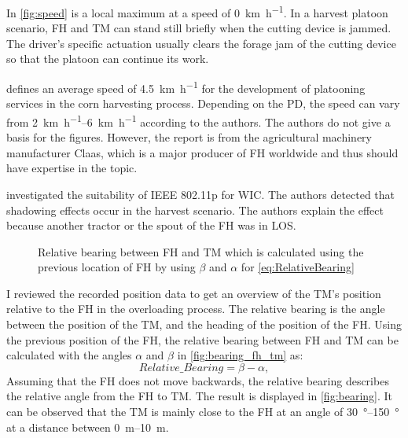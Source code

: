 In \autoref{fig:speed} is a local maximum at a speed of \SI{0}{\kilo\metre\per\hour}. In a harvest platoon scenario, \ac{FH} and \ac{TM} can stand still briefly when the cutting device is jammed.
The driver's specific actuation usually clears the forage jam of the cutting device so that the platoon can continue its work.

\textcite{smolnik_5g_2020} defines an average speed of \SI{4.5}{\kilo\metre\per\hour} for the development of platooning services in the corn harvesting process. Depending on the \ac{PD}, the speed can vary from \SIrange{2}{6}{\kilo\metre\per\hour} according to the authors.
The authors do not give a basis for the figures. However, the report is from the agricultural machinery manufacturer Claas, which is a major producer of \ac{FH} worldwide and thus should have expertise in the topic.

\textcite{klingler_agriculture_2018} investigated the suitability of IEEE 802.11p for \ac{WIC}. The authors detected that shadowing effects occur in the harvest scenario. The authors explain the effect because another tractor or the spout of the \ac{FH} was in \ac{LOS}.
\begin{figure}%
	\centering
	\caption{Relative bearing between \ac{FH} and \ac{TM} which is calculated using the previous location of \ac{FH} by using $\beta$ and $\alpha$ for \autoref{eq:RelativeBearing}}%
	\label{fig:bearing_fh_tm}%
\end{figure}
I reviewed the recorded position data to get an overview of the \ac{TM}'s position relative to the \ac{FH} in the overloading process. The relative bearing is the angle between the position of the \ac{TM}, and the heading of the position of the \ac{FH}. Using the previous position of the \ac{FH}, the relative bearing between \ac{FH} and \ac{TM} can be calculated with the angles $\alpha$ and $\beta$ in \autoref{fig:bearing_fh_tm} as:
\begin{equation}\label{eq:RelativeBearing}
	Relative\_Bearing = \beta - \alpha	,
\end{equation}
Assuming that the \ac{FH} does not move backwards, the relative bearing describes the relative angle from the \ac{FH} to \ac{TM}. The result is displayed in \autoref{fig:bearing}. It can be observed that the \ac{TM} is mainly close to the \ac{FH} at an angle of \SIrange{30}{150}{\degree} at a distance between \SIrange{0}{10}{\metre}. 

